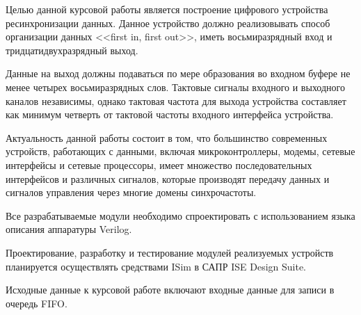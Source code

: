 \Introduction



Целью данной курсовой работы является построение цифрового устройства ресинхронизации данных. Данное устройство должно реализовывать способ организации данных <<first in, first out>>, иметь восьмиразрядный вход и тридцатидвухразрядный выход.

Данные на выход должны подаваться по мере образования во входном буфере не менее четырех восьмиразрядных слов. Тактовые сигналы входного и выходного каналов независимы, однако тактовая частота для выхода устройства составляет как минимум  четверть от тактовой частоты входного интерфейса устройства.

Актуальность данной работы состоит в том, что большинство современных устройств, работающих с данными, включая микроконтроллеры, модемы, сетевые интерфейсы и сетевые процессоры, имеет множество последовательных интерфейсов и различных сигналов, которые производят передачу данных и сигналов управления через многие домены синхрочастоты.

Все разрабатываемые модули необходимо спроектировать с использованием языка описания аппаратуры Verilog.

Проектирование, разработку и тестирование модулей реализуемых устройств планируется осуществлять средствами ISim в САПР ISE Design Suite.

Исходные данные к курсовой работе включают входные данные для записи в очередь FIFO.


%

